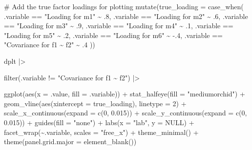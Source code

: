 \documentclass[
  letterpaper,
  DIV=11,
  numbers=noendperiod]{scrreprt}
\newenvironment{Shaded}{\begin{snugshade}}{\end{snugshade}}
\newcommand{\AttributeTok}[1]{\textcolor[rgb]{0.40,0.45,0.13}{#1}}
\newcommand{\CommentTok}[1]{\textcolor[rgb]{0.37,0.37,0.37}{#1}}
\newcommand{\ConstantTok}[1]{\textcolor[rgb]{0.56,0.35,0.01}{#1}}
\newcommand{\DecValTok}[1]{\textcolor[rgb]{0.68,0.00,0.00}{#1}}
\newcommand{\FloatTok}[1]{\textcolor[rgb]{0.68,0.00,0.00}{#1}}
\newcommand{\FunctionTok}[1]{\textcolor[rgb]{0.28,0.35,0.67}{#1}}
\newcommand{\NormalTok}[1]{\textcolor[rgb]{0.00,0.23,0.31}{#1}}
\newcommand{\SpecialCharTok}[1]{\textcolor[rgb]{0.37,0.37,0.37}{#1}}
\newcommand{\StringTok}[1]{\textcolor[rgb]{0.13,0.47,0.30}{#1}}
\begin{document}
\begin{Shaded}
\begin{Highlighting}[]
  \CommentTok{\# Add the true factor loadings for plotting}
  \FunctionTok{mutate}\NormalTok{(}\AttributeTok{true\_loading =} \FunctionTok{case\_when}\NormalTok{(}
\NormalTok{    .variable }\SpecialCharTok{==} \StringTok{"Loading for m1"} \SpecialCharTok{\textasciitilde{}}\NormalTok{ .}\DecValTok{8}\NormalTok{,}
\NormalTok{    .variable }\SpecialCharTok{==} \StringTok{"Loading for m2"} \SpecialCharTok{\textasciitilde{}}\NormalTok{ .}\DecValTok{6}\NormalTok{,}
\NormalTok{    .variable }\SpecialCharTok{==} \StringTok{"Loading for m3"} \SpecialCharTok{\textasciitilde{}}\NormalTok{ .}\DecValTok{9}\NormalTok{,}
\NormalTok{    .variable }\SpecialCharTok{==} \StringTok{"Loading for m4"} \SpecialCharTok{\textasciitilde{}}\NormalTok{ .}\DecValTok{1}\NormalTok{,}
\NormalTok{    .variable }\SpecialCharTok{==} \StringTok{"Loading for m5"} \SpecialCharTok{\textasciitilde{}}\NormalTok{ .}\DecValTok{2}\NormalTok{,}
\NormalTok{    .variable }\SpecialCharTok{==} \StringTok{"Loading for m6"} \SpecialCharTok{\textasciitilde{}} \SpecialCharTok{{-}}\NormalTok{.}\DecValTok{4}\NormalTok{,}
\NormalTok{    .variable }\SpecialCharTok{==} \StringTok{"Covariance for f1 \textasciitilde{} f2"} \SpecialCharTok{\textasciitilde{}}\NormalTok{ .}\DecValTok{4}
\NormalTok{  )) }

\NormalTok{dplt }\SpecialCharTok{|\textgreater{}}

  \FunctionTok{filter}\NormalTok{(.variable }\SpecialCharTok{!=} \StringTok{"Covariance for f1 \textasciitilde{} f2"}\NormalTok{) }\SpecialCharTok{|\textgreater{}}

  \FunctionTok{ggplot}\NormalTok{(}\FunctionTok{aes}\NormalTok{(}\AttributeTok{x =}\NormalTok{ .value, }\AttributeTok{fill =}\NormalTok{ .variable)) }\SpecialCharTok{+}
  \FunctionTok{stat\_halfeye}\NormalTok{(}\AttributeTok{fill =} \StringTok{"mediumorchid"}\NormalTok{) }\SpecialCharTok{+}
  \FunctionTok{geom\_vline}\NormalTok{(}\FunctionTok{aes}\NormalTok{(}\AttributeTok{xintercept =}\NormalTok{ true\_loading), }\AttributeTok{linetype =} \DecValTok{2}\NormalTok{) }\SpecialCharTok{+} 
  \FunctionTok{scale\_x\_continuous}\NormalTok{(}\AttributeTok{expand =} \FunctionTok{c}\NormalTok{(}\DecValTok{0}\NormalTok{, }\FloatTok{0.015}\NormalTok{)) }\SpecialCharTok{+}
  \FunctionTok{scale\_y\_continuous}\NormalTok{(}\AttributeTok{expand =} \FunctionTok{c}\NormalTok{(}\DecValTok{0}\NormalTok{, }\FloatTok{0.015}\NormalTok{)) }\SpecialCharTok{+}
  \FunctionTok{guides}\NormalTok{(}\AttributeTok{fill =} \StringTok{"none"}\NormalTok{) }\SpecialCharTok{+}
  \FunctionTok{labs}\NormalTok{(}\AttributeTok{x =} \StringTok{"lab"}\NormalTok{,}
     \AttributeTok{y =} \ConstantTok{NULL}\NormalTok{)  }\SpecialCharTok{+}
  \FunctionTok{facet\_wrap}\NormalTok{(}\SpecialCharTok{\textasciitilde{}}\NormalTok{.variable, }\AttributeTok{scales =} \StringTok{"free\_x"}\NormalTok{) }\SpecialCharTok{+}
  \FunctionTok{theme\_minimal}\NormalTok{() }\SpecialCharTok{+} 
  \FunctionTok{theme}\NormalTok{(}\AttributeTok{panel.grid.major =} \FunctionTok{element\_blank}\NormalTok{())}
\end{Highlighting}
\end{Shaded}
\end{document}
